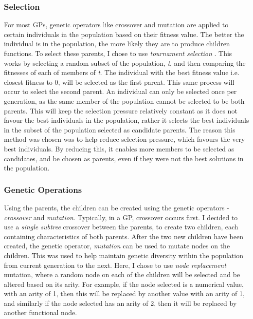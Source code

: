 \documentclass[11pt]{article}
\begin{document}
\subsubsection{Selection}\label{subsubsec:selection}
For most GPs, genetic operators like crossover and mutation are applied to certain individuals in the population based on their fitness value. The better the individual is in the population, the more likely they are to produce children functions. To select these parents, I chose to use \textit{tournament selection} \cite{?}. This works by selecting a random subset of the population, \textit{t}, and then comparing the fitnesses of each of members of \textit{t}. The individual with the best fitness value i.e. closest fitness to 0, will be selected as the first parent. This same process will occur to select the second parent. An individual can only be selected once per generation, as the same member of the population cannot be selected to be both parents. This will keep the selection pressure relatively constant as it does not favour the best individuals in the population, rather it selects the best individuals in the subset of the population selected as candidate parents. The reason this method was chosen was to help reduce selection pressure, which favours the very best individuals. By reducing this, it enables more members to be selected as candidates, and be chosen as parents, even if they were not the best solutions in the population. 
\subsubsection{Genetic Operations}\label{subsubsec:GO}
Using the parents, the children can be created using the genetic operators - \textit{crossover} and \textit{mutation}. Typically, in a GP, crossover occurs first. I decided to use a \textit{single subtree} crossover between the parents, to create two children, each containing characteristics of both parents.
After the two new children have been created, the genetic operator,  \textit{mutation} can be used to mutate nodes on the children. This was used to help maintain genetic diversity within the population from current generation to the next.  Here, I chose to use \textit{node replacement} mutation, where a random node on each of the children will be selected and be altered based on its arity. For example, if the node selected is a numerical value, with an arity of 1, then this will be replaced by another value with an arity of 1, and similarly if the node selected has an arity of 2, then it will be replaced by another functional node.
\end{document}
